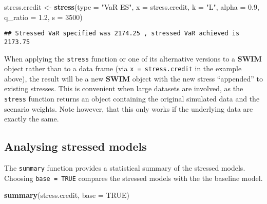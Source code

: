 \documentclass[
]{article}
\newenvironment{Shaded}{\begin{snugshade}}{\end{snugshade}}
\newcommand{\DataTypeTok}[1]{\textcolor[rgb]{0.13,0.29,0.53}{#1}}
\newcommand{\DecValTok}[1]{\textcolor[rgb]{0.00,0.00,0.81}{#1}}
\newcommand{\FloatTok}[1]{\textcolor[rgb]{0.00,0.00,0.81}{#1}}
\newcommand{\KeywordTok}[1]{\textcolor[rgb]{0.13,0.29,0.53}{\textbf{#1}}}
\newcommand{\NormalTok}[1]{#1}
\newcommand{\OtherTok}[1]{\textcolor[rgb]{0.56,0.35,0.01}{#1}}
\newcommand{\StringTok}[1]{\textcolor[rgb]{0.31,0.60,0.02}{#1}}
\begin{document}
\begin{Shaded}
\begin{Highlighting}[]
\NormalTok{stress.credit \textless{}{-}}\StringTok{ }\KeywordTok{stress}\NormalTok{(}\DataTypeTok{type =} \StringTok{"VaR ES"}\NormalTok{, }\DataTypeTok{x =}\NormalTok{ stress.credit, }\DataTypeTok{k =} \StringTok{"L"}\NormalTok{, }\DataTypeTok{alpha =} \FloatTok{0.9}\NormalTok{, }
    \DataTypeTok{q\_ratio =} \FloatTok{1.2}\NormalTok{, }\DataTypeTok{s =} \DecValTok{3500}\NormalTok{)}
\end{Highlighting}
\end{Shaded}

\begin{verbatim}
## Stressed VaR specified was 2174.25 , stressed VaR achieved is 2173.75
\end{verbatim}

When applying the \texttt{stress} function or one of its alternative versions to a \textbf{SWIM} object rather than to a data frame (via \texttt{x\ =\ stress.credit} in the example above), the result will be a new \textbf{SWIM} object with the new stress ``appended'' to existing stresses. This is convenient when large datasets are involved, as the \texttt{stress} function returns an object containing the original simulated data and the scenario weights. Note however, that this only works if the underlying data are exactly the same.

\hypertarget{analysing-stressed-models}{%
\subsection{Analysing stressed models}\label{analysing-stressed-models}}

The \texttt{summary} function provides a statistical summary of the stressed models. Choosing \texttt{base\ =\ TRUE} compares the stressed models with the the baseline model.

\begin{Shaded}
\begin{Highlighting}[]
\KeywordTok{summary}\NormalTok{(stress.credit, }\DataTypeTok{base =} \OtherTok{TRUE}\NormalTok{)}
\end{Highlighting}
\end{Shaded}
\end{document}
